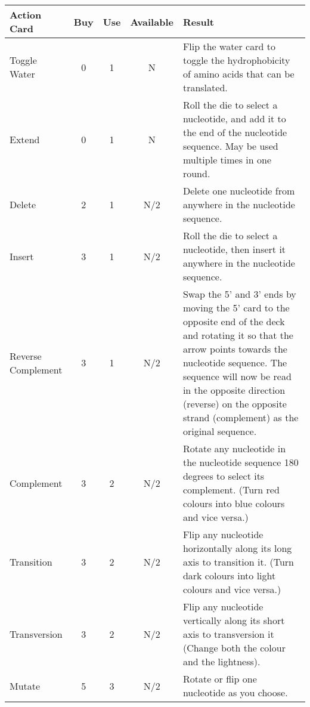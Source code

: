 \documentclass[a4paper,11pt,oneside]{memoir}
\begin{document}
\begin{table}[h!]
\begin{tabular}{lcccp{10cm}}
\hline
\textbf{Action Card} & \textbf{Buy} & \textbf{Use} & \textbf{Available} & \textbf{Result} \\
\hline
    Toggle Water                 & 0 & 1 & N & Flip the water card to toggle the hydrophobicity of amino acids that can be translated. \\
    Extend                       & 0 & 1 & N & Roll the die to select a nucleotide, and add it to the end of the nucleotide sequence. May be used multiple times in one round.\\
    Delete                       & 2 & 1 & N/2 & Delete one nucleotide from anywhere in the nucleotide sequence. \\
    Insert                       & 3 & 1 & N/2 & Roll the die to select a nucleotide, then insert it anywhere in the nucleotide sequence. \\
    Reverse Complement           & 3 & 1 & N/2 & Swap the 5' and 3' ends by moving the 5' card to the opposite end of the deck and rotating it so that the arrow points towards the nucleotide sequence.  The sequence will now be read in the opposite direction (reverse) on the opposite strand (complement) as the original sequence.  \\
    Complement                   & 3 & 2 & N/2 & Rotate any nucleotide in the nucleotide sequence 180 degrees to select its complement.  (Turn red colours into blue colours and vice versa.) \\
    Transition                   & 3 & 2 & N/2 & Flip any nucleotide horizontally along its long axis to transition it. (Turn dark colours into light colours and vice versa.) \\
    Transversion                 & 3 & 2 & N/2 & Flip any nucleotide vertically along its short axis to transversion it (Change both the colour and the lightness). \\
    Mutate                       & 5 & 3 & N/2 & Rotate or flip one nucleotide as you choose. \\
\hline
\end{tabular}
\label{actiontable}
\end{table}
\end{document}
